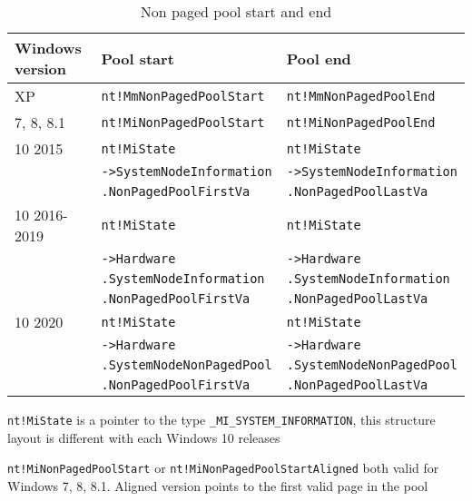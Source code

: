 \begin{table}[]
\begin{tabular}{lll}
\hline
Windows version & Pool start                      & Pool end                      \\ \hline
XP              & \texttt{nt!MmNonPagedPoolStart} & \texttt{nt!MmNonPagedPoolEnd} \\
7, 8, 8.1       & \texttt{nt!MiNonPagedPoolStart} & \texttt{nt!MiNonPagedPoolEnd} \\
10 2015         & \texttt{nt!MiState}
                & \texttt{nt!MiState} \\
                & \texttt{->SystemNodeInformation}
                & \texttt{->SystemNodeInformation} \\
                & \texttt{.NonPagedPoolFirstVa}
                & \texttt{.NonPagedPoolLastVa} \\
10 2016-2019    & \texttt{nt!MiState}
                & \texttt{nt!MiState} \\
                & \texttt{->Hardware}
                & \texttt{->Hardware} \\
                & \texttt{.SystemNodeInformation}
                & \texttt{.SystemNodeInformation} \\
                & \texttt{.NonPagedPoolFirstVa}
                & \texttt{.NonPagedPoolLastVa} \\
10 2020         & \texttt{nt!MiState}
                & \texttt{nt!MiState} \\
                & \texttt{->Hardware}
                & \texttt{->Hardware} \\
                & \texttt{.SystemNodeNonPagedPool}
                & \texttt{.SystemNodeNonPagedPool} \\
                & \texttt{.NonPagedPoolFirstVa}
                & \texttt{.NonPagedPoolLastVa} \\ \hline
\end{tabular}
  {\raggedright \texttt{nt!MiState} is a pointer to the type
  \texttt{\_MI\_SYSTEM\_INFORMATION}, this structure layout is different with
  each Windows 10 releases \par}
  {\raggedright \texttt{nt!MiNonPagedPoolStart} or
  \texttt{nt!MiNonPagedPoolStartAligned} both valid for Windows 7, 8, 8.1. Aligned
  version points to the first valid page in the pool \par}

  \caption{Non paged pool start and end}
  \label{tab:nonpaged}
\end{table}

